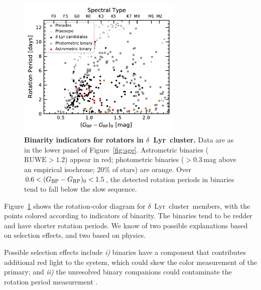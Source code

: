 \documentclass[12pt,modern,twocolumn,tighten]{aastex63}
\newcommand{\cn}{$\delta$\ Lyr\ cluster} %
\newcommand{\bpmrpo}{(G_{\rm BP}-G_{\rm RP})_0}
\begin{document}
\begin{figure}[t]
	\begin{center}
		\leavevmode
		\includegraphics[width=0.7\textwidth]{f15supp.pdf}
	\end{center}
	\vspace{-0.7cm}
  \caption{ {\bf Binarity indicators for rotators in \cn.} 
    Data are as in the lower panel of
    Figure~\ref{fig:age}.  Astrometric binaries ($\mathrm{RUWE}>1.2$)
    appear in red; photometric binaries ($>$0.3\,mag above an
    empirical isochrone; 20\% of stars) are orange.  
    Over $0.6<\bpmrpo<1.5$, the detected rotation periods in binaries tend to 
    fall below the slow sequence.
		\label{fig:binarity}
	}
\end{figure}

Figure~\ref{fig:binarity} shows the rotation-color diagram for \cn\
members, with the points colored according to indicators of binarity.
The binaries tend to be redder and have shorter rotation periods.  We
know of two possible explanations based on selection effects, and two
based on physics.

Possible selection effects include {\it i)} binaries have a component
that contributes additional red light to the system, which could skew
the color measurement of the primary; and {\it ii)} the unresolved
binary companions could contaminate the rotation period measurement
\citep[{\it e.g.},][Section~5.1]{stauffer_rotation_2016}.
\end{document}
